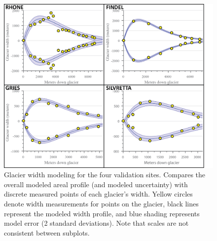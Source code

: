 \documentclass[review]{elsarticle}
\begin{document}
\begin{figure}
    \centering
    \includegraphics[width=\textwidth]{Figures/Width.png}
    \caption{Glacier width modeling for the four validation sites. Compares the overall modeled areal profile (and modeled uncertainty) with discrete measured points of each glacier’s width. Yellow circles denote width measurements for points on the glacier, black lines represent the modeled width profile, and blue shading represents model error (2 standard deviations). Note that scales are not consistent between subplots.}
    \label{fig:width}
\end{figure}
\end{document}
